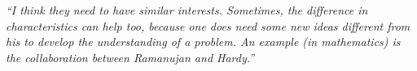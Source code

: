 \documentclass[12pt]{beamer}
\newcommand\ans[1]{{\it ``#1''}}
\begin{document}
\begin{frame}

  \ans{I think they need to have similar interests.  Sometimes, the difference in characteristics can  help  too,  because  one  does  need  some  new  ideas  different  from  his  to  develop the  understanding  of  a  problem.   An  example  (in  mathematics)  is  the  collaboration between Ramanujan and Hardy.}











\end{frame} 
\end{document}
